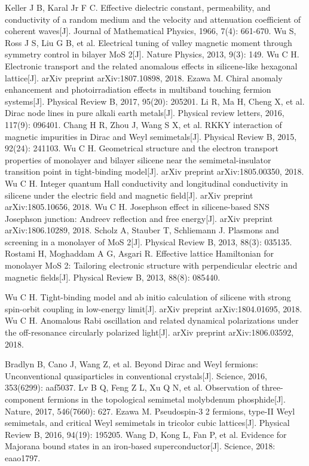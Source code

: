 \documentclass[UTF8,a4paper]{article}
\begin{document}
\begin{thebibliography}{99}
Keller J B, Karal Jr F C. Effective dielectric constant, permeability, and conductivity of a random medium and the velocity and attenuation coefficient of coherent waves[J]. Journal of Mathematical Physics, 1966, 7(4): 661-670.
Wu S, Ross J S, Liu G B, et al. Electrical tuning of valley magnetic moment through symmetry control in bilayer MoS 2[J]. Nature Physics, 2013, 9(3): 149.
Wu C H. Electronic transport and the related anomalous effects in silicene-like hexagonal lattice[J]. arXiv preprint arXiv:1807.10898, 2018.
Ezawa M. Chiral anomaly enhancement and photoirradiation effects in multiband touching fermion systems[J]. Physical Review B, 2017, 95(20): 205201.
Li R, Ma H, Cheng X, et al. Dirac node lines in pure alkali earth metals[J]. Physical review letters, 2016, 117(9): 096401.
Chang H R, Zhou J, Wang S X, et al. RKKY interaction of magnetic impurities in Dirac and Weyl semimetals[J]. Physical Review B, 2015, 92(24): 241103.
Wu C H. Geometrical structure and the electron transport properties of monolayer and bilayer silicene near the semimetal-insulator transition point in tight-binding model[J]. arXiv preprint arXiv:1805.00350, 2018.
Wu C H. Integer quantum Hall conductivity and longitudinal conductivity in silicene under the electric field and magnetic field[J]. arXiv preprint arXiv:1805.10656, 2018.
Wu C H. Josephson effect in silicene-based SNS Josephson junction: Andreev reflection and free energy[J]. arXiv preprint arXiv:1806.10289, 2018.
Scholz A, Stauber T, Schliemann J. Plasmons and screening in a monolayer of MoS 2[J]. Physical Review B, 2013, 88(3): 035135.
Rostami H, Moghaddam A G, Asgari R. Effective lattice Hamiltonian for monolayer MoS 2: Tailoring electronic structure with perpendicular electric and magnetic fields[J]. Physical Review B, 2013, 88(8): 085440.

Wu C H. Tight-binding model and ab initio calculation of silicene with strong spin-orbit coupling in low-energy limit[J]. arXiv preprint arXiv:1804.01695, 2018.
Wu C H. Anomalous Rabi oscillation and related dynamical polarizations under the off-resonance circularly polarized light[J]. arXiv preprint arXiv:1806.03592, 2018.

Bradlyn B, Cano J, Wang Z, et al. Beyond Dirac and Weyl fermions: Unconventional quasiparticles in conventional crystals[J]. Science, 2016, 353(6299): aaf5037.
Lv B Q, Feng Z L, Xu Q N, et al. Observation of three-component fermions in the topological semimetal molybdenum phosphide[J]. Nature, 2017, 546(7660): 627.
Ezawa M. Pseudospin-3 2 fermions, type-II Weyl semimetals, and critical Weyl semimetals in tricolor cubic lattices[J]. Physical Review B, 2016, 94(19): 195205.
Wang D, Kong L, Fan P, et al. Evidence for Majorana bound states in an iron-based superconductor[J]. Science, 2018: eaao1797.


\end{thebibliography}
\end{document}

